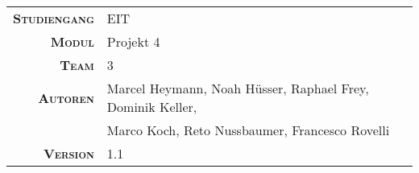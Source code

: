 \begin{titlepage}

    \maketitle

    \vspace{60mm}

    \begin{tabular}{r|l}

        \textsc{\textbf{Studiengang}}
        & EIT\\
        [4mm]

        \textsc{\textbf{Modul}}
        & Projekt 4 \\
        [4mm]

        \textsc{\textbf{Team}}
        & 3 \\
        [4mm]

        \textsc{\textbf{Autoren}}
        & Marcel Heymann, Noah H\"usser, Raphael Frey, Dominik Keller,  \\
        & Marco Koch, Reto Nussbaumer, Francesco Rovelli                \\
        [4mm]

        \textsc{\textbf{Version}}
        & 1.1 \\
    \end{tabular}

\end{titlepage}
